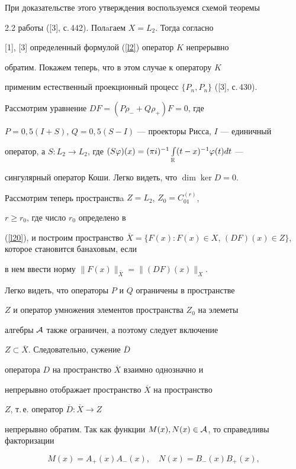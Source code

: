 При доказательстве этого утверждения воспользуемся схемой теоремы


2.2 работы ([3], с.\,442). Полaгаем $X=L_2$. Тогда согласно 


[1], [3] определенный формулой (\ref{l2}) оператор $K$ непрерывно


обратим. Покажем теперь, что в этом случае к оператору $K$


применим естественный проекционный процесс $\{P_n, P_n\}$ ([3], с.\,430).


Рассмотрим уравнение $DF=(P\rho_-+Q\rho_+)F=0$, где


$P=0{,}5(I+S)$, $Q=0{,}5(S-I)$ --- проекторы Рисса, $I$ --- единичный


оператор, а $S:L_2\to L_2$, где $(S\varphi)(x)=(\pi


i)^{-1}\int\limits_{\Bbb R} (t-x)^{-1}\varphi(t)dt$ ---


сингулярный оператор Коши. Легко видеть, что $\dim \ker D=0$.


Рассмотрим теперь пространствa $Z=L_2$, $Z_0=C_{01}^{(r)}$,


$r\geqslant r_0$, где число $r_0$ определено в


(\ref{l20}), и построим пространство $\overline{X}=\{F(x): 


F(x)\in X$, $(DF)(x)\in Z\}$, которое становится банаховым, если


в нем ввести норму $\|F(x)\|_{\overline{X}}=\|(DF)(x)\|_{X}$.


Легко видеть, что операторы $P$ и $Q$ ограничены в пространстве


$Z$ и оператор умножения элементов пространства $Z_0$ на элеметы


алгебры ${\cal A}$ также ограничен, а поэтому следует включение


$Z\subset \overline{X}$. Следовательно, сужение $\overline{D}$


оператора $D$ на пространство $\overline{X}$ взаимно однозначно и


непрерывно отображает пространство $\overline{X}$ на пространство


$Z$, т.\,е. оператор $\overline{D}: \overline{X}\rightarrow Z$


непрерывно обратим. Так как функции $M(x), N(x) \in {\cal


A}$, то справедливы факторизации


$$


M(x)=A_+(x)A_-(x), \quad N(x)=B_-(x)B_+(x),


$$


